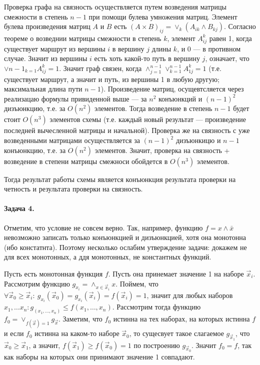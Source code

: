 \documentclass{article}
\begin{document}
    Проверка графа на связность осуществляется путем возведения матрицы смежности в степень $n - 1$ при помощи булева умножения матриц. Элемент булева произведения матриц $A$ и $B$ есть $(A \times B)_{ij} = \lor_{k} (A_{ik}\land B_{kj})$. Согласно теореме о возведнии матрицы смежности в степень $k$, элемент $A^{k}_{ij}$ равен 1, когда существует маршрут из вершины $i$ в вершину $j$ длины $k$, и 0 --- в противном случае. Значит из вершины $i$ есть хоть какой-то путь в вершину $j$, означает, что $\lor{n - 1}_{k=1} A^k_{ij} = 1$. Значит граф связен, когда $\wedge^{n - 1}_{j=1} \lor^{n - 1}_{k=1} A^k_{1j} = 1$ (т.е. существует маршрут, а значит и путь, из вершины 1 в любую другую; максимальная длина пути $n - 1$). Произведение матриц, осущевтсляется через реализацаю формулы привиденной выше --- за $n^2$ конъюнкций и $(n-1)^2$ дизъюнкцию, т.е. за $O(n^2)$ элементов. Тогда возведение в степень $n - 1$ будет стоит $O(n^3)$ элементов схемы (т.е. каждый новый результат --- произведение последней вычесленной матрицы и начальной). Проверка же на связность с уже возведенными матрицами осуществляется за $(n - 1)^2$ дизъюнкицю и $n - 1$ конъюнкцию, т.е. за $O(n^2)$ элементов. Значит, проверка на связность + возведение в степени матрицы смежноси обойдется в $O(n^3)$ элементов.

    Тогда результат работы схемы является конъюнкция результата проверки на четность и результата проверки на связность. 

    \paragraph{Задача 4.}
    Отметим, что условие не совсем верно. Так, например, функцию $f = x \land \bar{x}$ невозможно записать только конъюнкцией и дизъюнкцией, хотя она монотонна (ибо констатнта). Поэтому несколько ослабим утверждение задачи: докажем не для всех монотонных, а ддя монотонных, не константных функций.

    Пусть есть монотонная функция $f$. Пусть она принемает значение 1 на наборе $\vec{x}_i$. Рассмотрим функцию $\displaystyle{g_{x_i} = \land_{x \in \vec{x}_i} x}$. Поймем, что $\forall \vec{x}_0 \ge \vec{x}_i:\ g_{x_i}(\vec{x}_0) = g_{x_i}(\vec{x}_i) = f(\vec{x}_i) = 1$, значит для любых наборов $x_1, \ldots x_n: g_{(x_1, \ldots, x_n)} \le f(x_1, \ldots, x_n)$. Рассмотрим тогда функцию $f_0 = \lor_{f(\vec{x}) = 1} g_{\vec{x}}$. Заметим, что $f_0$ истинна на тех наборах, на которых истинна $f$ и если $f_0$ истинна на каком-то наборе $\vec{x}_0$, то сущесвует такое слагаемое $g_{\vec{x}_1}$, что $\vec{x}_0 \ge \vec{x}_1$, а значит, $f(\vec{x}_1) \ge f(\vec{x}_0) = 1$ по построению $g_{\vec{x}_0}$. Значит $f_0 = f$, так как наборы на которых они принимают значение 1 совпадают.
\end{document}
